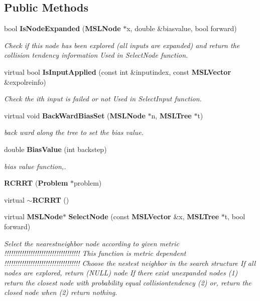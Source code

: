 \subsection*{Public Methods}
\begin{CompactItemize}
\item 
bool {\bf Is\-Node\-Expanded} ({\bf MSLNode} $\ast$x, double \&biasvalue, bool forward)
\begin{CompactList}\small\item\em Check if this node has been explored (all inputs are expanded) and return the collision tendency information Used in Select\-Node function.\item\end{CompactList}\item 
virtual bool {\bf Is\-Input\-Applied} (const int \&inputindex, const {\bf MSLVector} \&expolreinfo)
\begin{CompactList}\small\item\em Check the ith input is failed or not Used in Select\-Input function.\item\end{CompactList}\item 
virtual void {\bf Back\-Ward\-Bias\-Set} ({\bf MSLNode} $\ast$n, {\bf MSLTree} $\ast$t)
\begin{CompactList}\small\item\em back ward along the tree to set the bias value.\item\end{CompactList}\item 
double {\bf Bias\-Value} (int backstep)
\begin{CompactList}\small\item\em bias value function,.\item\end{CompactList}\item 
{\bf RCRRT} ({\bf Problem} $\ast$problem)
\item 
virtual {\bf $\sim$RCRRT} ()
\item 
virtual {\bf MSLNode}$\ast$ {\bf Select\-Node} (const {\bf MSLVector} \&x, {\bf MSLTree} $\ast$t, bool forward)
\begin{CompactList}\small\item\em Select the nearestneighbor node according to given metric !!!!!!!!!!!!!!!!!!!!!!!!!!!!!!!!!!! This function is metric dependent !!!!!!!!!!!!!!!!!!!!!!!!!!!!!!!!!!! Choose the nestest neighbor in the search structure If all nodes are explored, return (NULL) node If there exist unexpanded nodes (1) return the closest node with probability equal collisiontendency (2) or, return the closed node when (2) return nothing.\item\end{CompactList}\item 

\end{CompactItemize}
